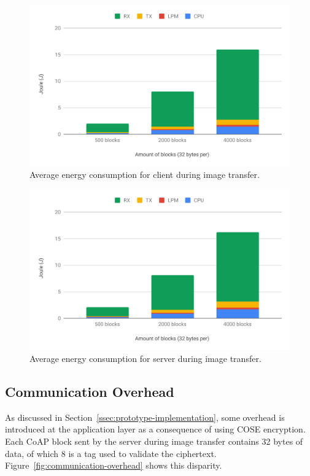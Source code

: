 \documentclass[0-thesis.tex]{subfiles}
\begin{document}
\begin{figure}[]
    \caption{Average energy consumption for client during image transfer.}
    \label{fig:client-image-energy}
    \includegraphics[scale=0.77]{images/client-image-energy.pdf}
\end{figure}

\begin{figure}[]
    \caption{Average energy consumption for server during image transfer.}
    \label{fig:server-image-energy}
    \includegraphics[scale=0.77]{images/server-image-energy.pdf}
\end{figure}

\newpage    %
\subsection{Communication Overhead}
\label{ssec:communication-overhead}
As discussed in Section~\ref{ssec:prototype-implementation}, some overhead is introduced
at the application layer as a consequence of using COSE encryption. Each CoAP block sent by
the server during image transfer contains 32 bytes of data, of which 8 is a tag used to
validate the ciphertext. Figure~\ref{fig:communication-overhead} shows this disparity.
\end{document}
